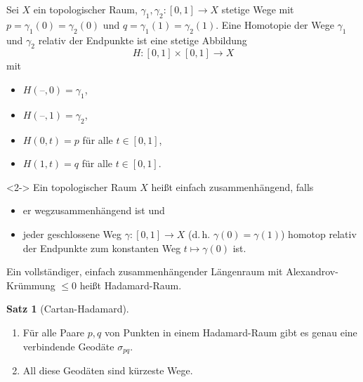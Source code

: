 \documentclass{beamer}
\newcommand{\I}{\left[0,1\right]} %
\renewcommand{\emph}[1]{\textcolor{Emph}{#1}}
\newcommand{\blank}{\text{--}}
\theoremstyle{definition}
\newtheorem*{satz}{Satz}
\begin{document}
\begin{frame}
  \begin{definition}
    Sei $X$ ein topologischer Raum, $\gamma_1, \gamma_2 : \left[ 0, 1 \right] \to X$ stetige Wege mit $p = \gamma_1(0) = \gamma_2(0)$ und $q = \gamma_1(1) = \gamma_2(1)$. Eine \emph{Homotopie} der Wege $\gamma_1$ und $\gamma_2$ \emph{relativ der Endpunkte} ist eine stetige Abbildung
    \[ H : \I \times \I \to X \]
    mit
    \begin{itemize}
      \item $H(\blank, 0) = \gamma_1$,
      \item $H(\blank, 1) = \gamma_2$,
      \item $H(0, t) = p$ für alle $t \in \I$,
      \item $H(1, t) = q$ für alle $t \in \I$.
    \end{itemize}
  \end{definition}

  \begin{definition}<2->
    Ein topologischer Raum $X$ heißt \emph{einfach zusammenhängend}, falls
    \begin{itemize}
      \item er wegzusammenhängend ist und
      \item jeder geschlossene Weg $\gamma : \I \to X$ (d.\,h. $\gamma(0) = \gamma(1)$) homotop relativ der Endpunkte zum konstanten Weg $t \mapsto \gamma(0)$ ist.
    \end{itemize}
  \end{definition}
\end{frame}

\begin{frame}
  \begin{definition}
    Ein vollständiger, einfach zusammenhängender Längenraum mit Alexandrov-Krümmung $\leq 0$ heißt \emph{Hadamard-Raum}.
  \end{definition}

  \begin{satz}[Cartan-Hadamard]
    \begin{enumerate}
      \item Für alle Paare $p, q$ von Punkten in einem Hadamard-Raum gibt es genau eine verbindende Geodäte $\sigma_{pq}$.
      \item All diese Geodäten sind kürzeste Wege.
    \end{enumerate}
  \end{satz}
\end{frame}
\end{document}
